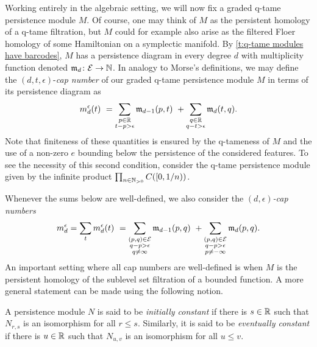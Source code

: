 Working entirely in the algebraic setting, we will now fix a graded q-tame persistence module $M$.
Of course, one may think of $M$ as the persistent homology of a q-tame filtration, but $M$ could for example also arise as the filtered Floer homology of some Hamiltonian on a symplectic manifold.
By \cref{t:q-tame modules have barcodes}, $M$ has a persistence diagram in every degree $d$ with multiplicity function denoted $\mathfrak{m}_d \colon \mathcal{E} \to \mathbb{N}$.
In analogy to Morse's definitions, we may define the $(d, t, \epsilon)$-\emph{cap number} of our graded q-tame persistence module $M$ in terms of its persistence diagram as
\begin{equation*}
m_{d}^{\epsilon}(t) \ =
\sum_{\substack{p \in \mathbb{R} \\ t - p > \epsilon}} \mathfrak{m}_{d-1}(p, t) \ +
\sum_{\substack{q \in \mathbb{R} \\ q - t > \epsilon}} \mathfrak{m}_d(t, q).
\end{equation*}
Note that finiteness of these quantities is ensured by the q-tameness of $M$ and the use of a non-zero $e$ bounding below the persistence of the considered features.
To see the necessity of this second condition, consider the q-tame persistence module given by the infinite product $\prod_{n \in \mathbb{N}_{> 0}} C([0,1/n))$.

Whenever the sums below are well-defined, we also consider the \emph{$(d,\epsilon)$-cap numbers} 
\begin{equation} \label{e:cap numbers}
m_{d}^{\epsilon} =
\sum_{t} m_{d}^{\epsilon}(t) \ =
\sum_{\substack{(p,q) \in \mathcal{E} \\ q - p > \epsilon \\ q \neq \infty}} \mathfrak{m}_{d-1}(p,q) \ +
\sum_{\substack{(p,q) \in \mathcal{E} \\ q - p > \epsilon \\ p \neq -\infty}}\mathfrak{m}_d(p,q).
\end{equation}
An important setting where all cap numbers are well-defined is when $M$ is the persistent homology of the sublevel set filtration of a bounded function.
A more general statement can be made using the following notion.

\begin{defi} \label{d:initially and eventually constant}
	A persistence module $N$ is said to be \emph{initially constant} if there is $s \in \mathbb{R}$ such that $N_{r,s}$ is an isomorphism for all $r \leq s$.
	Similarly, it is said to be \emph{eventually constant} if there is $u \in \mathbb{R}$
	such that $N_{u,v}$ is an isomorphism for all $u \leq v$.
\end{defi}

